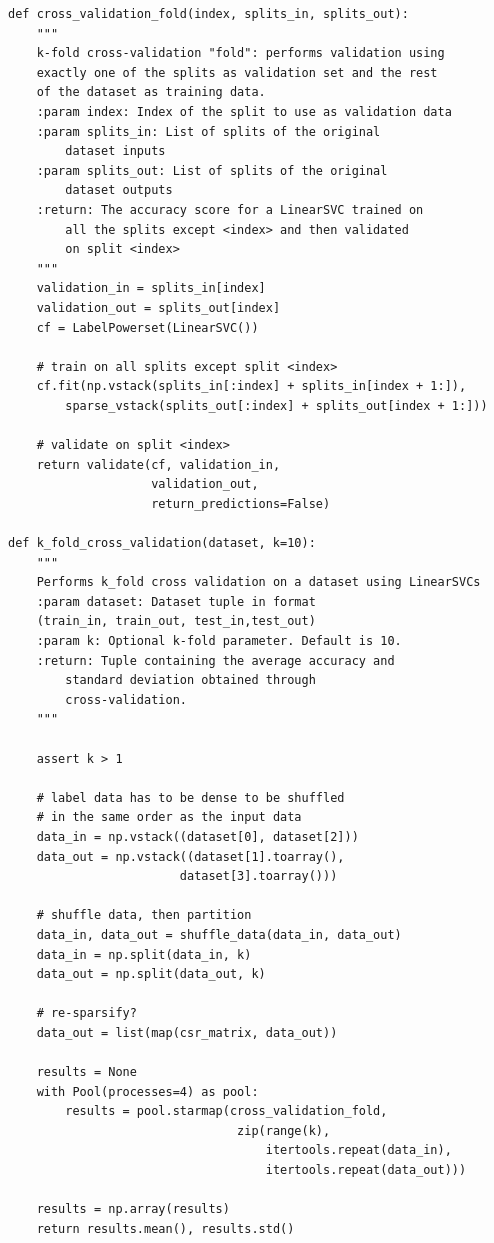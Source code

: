 \documentclass{kthreport}
\theoremstyle{definition}
\begin{document}
\printbibliography
\newpage
\begin{lstlisting}[style=MyPython, caption={Extract of the k-fold cross-validation subroutines.}, label={lst:kfoldcv}]
def cross_validation_fold(index, splits_in, splits_out):
	"""
	k-fold cross-validation "fold": performs validation using 
    exactly one of the splits as validation set and the rest 
    of the dataset as training data.
	:param index: Index of the split to use as validation data
	:param splits_in: List of splits of the original 
        dataset inputs
	:param splits_out: List of splits of the original 
        dataset outputs
	:return: The accuracy score for a LinearSVC trained on 
        all the splits except <index> and then validated 
        on split <index>
	"""
	validation_in = splits_in[index]
	validation_out = splits_out[index]
	cf = LabelPowerset(LinearSVC())
	
	# train on all splits except split <index>
	cf.fit(np.vstack(splits_in[:index] + splits_in[index + 1:]),
		sparse_vstack(splits_out[:index] + splits_out[index + 1:]))
	
	# validate on split <index>
	return validate(cf, validation_in, 
                    validation_out, 
                    return_predictions=False)

def k_fold_cross_validation(dataset, k=10):
	"""
	Performs k_fold cross validation on a dataset using LinearSVCs
	:param dataset: Dataset tuple in format 
    (train_in, train_out, test_in,test_out)
	:param k: Optional k-fold parameter. Default is 10.
	:return: Tuple containing the average accuracy and 
        standard deviation obtained through 
        cross-validation.
	"""
	
	assert k > 1
	
	# label data has to be dense to be shuffled
	# in the same order as the input data
	data_in = np.vstack((dataset[0], dataset[2]))
	data_out = np.vstack((dataset[1].toarray(),
                        dataset[3].toarray()))
	
	# shuffle data, then partition
	data_in, data_out = shuffle_data(data_in, data_out)
	data_in = np.split(data_in, k)
	data_out = np.split(data_out, k)
	
	# re-sparsify?
	data_out = list(map(csr_matrix, data_out))
	
	results = None
	with Pool(processes=4) as pool:
		results = pool.starmap(cross_validation_fold,
                                zip(range(k),
                                    itertools.repeat(data_in),
                                    itertools.repeat(data_out)))
	
	results = np.array(results)
	return results.mean(), results.std()
\end{lstlisting}
\end{document}
